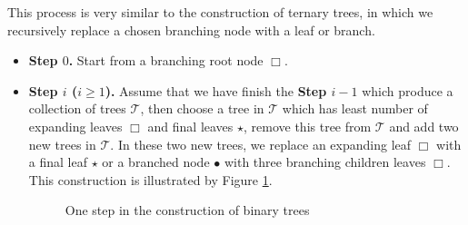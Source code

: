 This process is very similar to the construction of ternary trees, in which we recursively replace a chosen branching node with a leaf or branch.

\begin{itemize}
 \item \textbf{Step $0$.} Start from a branching root node $\Box$.
 
 \item \textbf{Step $i$ ($i\ge 1$).} Assume that we have finish the \textbf{Step $i-1$} which produce a collection of trees $\mathscr{T}$, then choose a tree in $\mathscr{T}$ which has least number of expanding leaves $\Box$ and final leaves $\star$, remove this tree from $\mathscr{T}$ and add two new trees in $\mathscr{T}$. In these two new trees, we replace an expanding leaf $\Box$ with a final leaf $\star$ or a branched node $\bullet$ with three branching children leaves $\Box$. This construction is illustrated by Figure \ref{fig.construction.fourwave}.
 \begin{figure}[H]
 \centering
 \caption{One step in the construction of binary trees}
 \label{fig.construction.fourwave}
 \end{figure}
 


\end{itemize}
